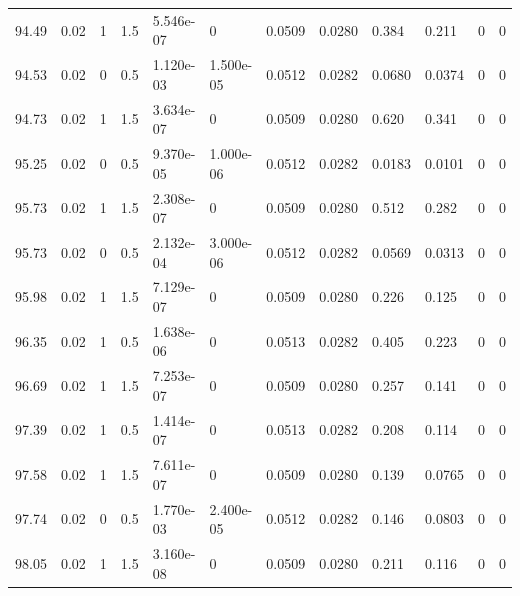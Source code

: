 \documentclass[preview]{standalone}
\begin{document}
{{{{{{{\begin{tabular}{L{1.2cm}C{1.2cm} C{0.3cm}C{0.5cm} C{1.4cm}C{1.4cm} C{1.4cm}C{1.4cm} C{1.6cm}C{1.6cm} C{1.6cm}C{1.6cm}}
  94.49  &  0.02  & 1     & 1.5 &  5.546e-07  & 0  &  0.0509&   0.0280& 0.384 & 0.211   &  0 & 0  \\ 
  94.53  &  0.02  & 0     & 0.5 &  1.120e-03  & 1.500e-05  &  0.0512&   0.0282& 0.0680 & 0.0374   &  0 & 0  \\ 
  94.73  &  0.02  & 1     & 1.5 &  3.634e-07  & 0  &  0.0509&   0.0280& 0.620 & 0.341   &  0 & 0  \\ 
  95.25  &  0.02  & 0     & 0.5 &  9.370e-05  & 1.000e-06  &  0.0512&   0.0282& 0.0183 & 0.0101   &  0 & 0  \\ 
  95.73  &  0.02  & 1     & 1.5 &  2.308e-07  & 0  &  0.0509&   0.0280& 0.512 & 0.282   &  0 & 0  \\ 
  95.73  &  0.02  & 0     & 0.5 &  2.132e-04  & 3.000e-06  &  0.0512&   0.0282& 0.0569 & 0.0313   &  0 & 0  \\ 
  95.98  &  0.02  & 1     & 1.5 &  7.129e-07  & 0  &  0.0509&   0.0280& 0.226 & 0.125   &  0 & 0  \\ 
  96.35  &  0.02  & 1     & 0.5 &  1.638e-06  & 0  &  0.0513&   0.0282& 0.405 & 0.223   &  0 & 0  \\ 
  96.69  &  0.02  & 1     & 1.5 &  7.253e-07  & 0  &  0.0509&   0.0280& 0.257 & 0.141   &  0 & 0  \\ 
  97.39  &  0.02  & 1     & 0.5 &  1.414e-07  & 0  &  0.0513&   0.0282& 0.208 & 0.114   &  0 & 0  \\ 
  97.58  &  0.02  & 1     & 1.5 &  7.611e-07  & 0  &  0.0509&   0.0280& 0.139 & 0.0765   &  0 & 0  \\ 
  97.74  &  0.02  & 0     & 0.5 &  1.770e-03  & 2.400e-05  &  0.0512&   0.0282& 0.146 & 0.0803   &  0 & 0  \\ 
  98.05  &  0.02  & 1     & 1.5 &  3.160e-08  & 0  &  0.0509&   0.0280& 0.211 & 0.116   &  0 & 0  \\ 
\hline 
\end{tabular} 

}}}}}}}
\end{document}
